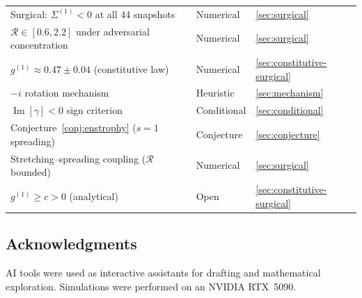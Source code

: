 \documentclass[11pt]{article}
\theoremstyle{definition}
\DeclareMathOperator{\im}{Im}
\begin{document}
\begin{center}
\begin{tabular}{@{}lll@{}}
Surgical: $\Sigma^{(1)}<0$ at all 44 snapshots
  & Numerical & \ref{sec:surgical} \\
$\mathcal{R}\in[0.6,2.2]$ under adversarial concentration
  & Numerical & \ref{sec:surgical} \\
$g^{(1)}\approx 0.47\pm 0.04$ (constitutive law)
  & Numerical & \ref{sec:constitutive-surgical} \\
$-i$ rotation mechanism
  & Heuristic & \ref{sec:mechanism} \\
$\im[\gamma]<0$ sign criterion
  & Conditional & \ref{sec:conditional} \\
Conjecture~\ref{conj:enstrophy} ($s=1$ spreading)
  & Conjecture & \ref{sec:conjecture} \\
Stretching--spreading coupling ($\mathcal{R}$ bounded)
  & Numerical & \ref{sec:surgical} \\
$g^{(1)}\geq c > 0$ (analytical)
  & Open & \ref{sec:constitutive-surgical} \\
\bottomrule
\end{tabular}
\end{center}

\subsection*{Acknowledgments}

AI tools were used as interactive assistants for drafting
and mathematical exploration.
Simulations were performed on an NVIDIA RTX~5090.
\end{document}
